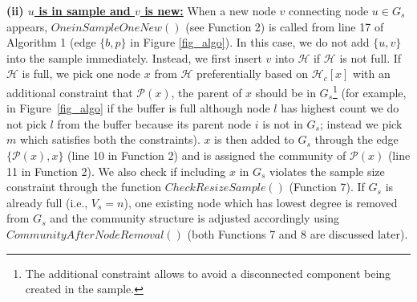 \noindent\textbf{(ii) \underline{$u$ is in sample and $v$ is new:}} When a new node $v$  connecting node $u\in G_s$ appears, $OneinSampleOneNew()$ (see Function 2) is called from line 17 of Algorithm 1 (edge $\{b,p\}$ in Figure \ref{fig_algo}). In this case, we do not add $\{u,v\}$ into the sample immediately. Instead, we first insert $v$ into $\mathcal{H}$ if $\mathcal{H}$ is not full. If $\mathcal{H}$ is full, we pick one node $x$ from $\mathcal{H}$ preferentially based on $\mathcal{H}_c[x]$ with an additional constraint that $\mathcal{P}(x)$, the parent of $x$  should be in $G_s$\footnote{The additional constraint allows to avoid a disconnected component being created in the sample.} (for example, in Figure~\ref{fig_algo} if the buffer is full although node $l$ has highest count we do not pick $l$ from the buffer  because its parent node $i$ is not in $G_s$; instead we pick $m$ which satisfies both the constraints).  $x$ is then added to $G_s$ through the edge $\{\mathcal{P}(x),x\}$ (line 10 in Function 2) and is assigned the community of $\mathcal{P}(x)$ (line 11 in Function 2). We also check if including $x$ in $G_s$ violates the sample size constraint through the function 
$CheckResizeSample()$ (Function 7). If $G_s$ is already full (i.e., $V_s=n$), one existing node which has lowest degree is removed from $G_s$ and the community structure is adjusted accordingly using $CommunityAfterNodeRemoval()$ (both Functions 7 and 8 are discussed later).





